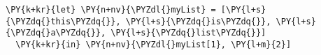 \begin{Verbatim}[commandchars=\\\{\}]
\PY{k+kr}{let} \PY{n+nv}{\PYZdl{}myList} = [\PY{l+s}{\PYZdq{}this\PYZdq{}}, \PY{l+s}{\PYZdq{}is\PYZdq{}}, \PY{l+s}{\PYZdq{}a\PYZdq{}}, \PY{l+s}{\PYZdq{}list\PYZdq{}}]
  \PY{k+kr}{in} \PY{n+nv}{\PYZdl{}myList[1}, \PY{l+m}{2}]
\end{Verbatim}
